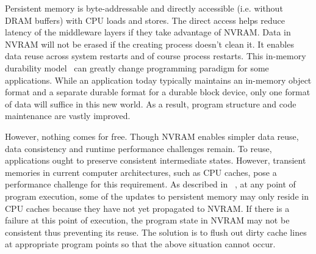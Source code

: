 \documentclass[preprint,nocopyrightspace,10pt]{sigplanconf}
\begin{document}
Persistent memory is byte-addressable and directly accessible (i.e. without DRAM buffers)
with CPU loads and stores. The direct access helps reduce latency of
the middleware layers if they take advantage of NVRAM. Data in NVRAM
will not be erased if the creating process doesn't  
clean it. It enables data reuse across system restarts and of course process restarts.
This in-memory durability model~\cite{Dhruva+:OOPSLA14} can greatly
change programming paradigm for some 
applications. While an application today typically maintains an
in-memory object format and a separate durable format for a durable
block device, only one format of data will suffice in this new world. 
As a result, program structure and code maintenance are vastly
improved. 

However, nothing comes for free. Though NVRAM enables simpler data reuse,
data consistency and runtime performance challenges remain. 
To reuse, applications ought to preserve consistent intermediate
states. However, transient memories in current computer architectures,
such as CPU caches, pose a performance challenge for this
requirement. As described in ~\cite{Dhruva+:OOPSLA14}, at any point of
program execution, some of the updates to persistent memory may only
reside in CPU caches because they have not yet propagated to NVRAM. If
there is a failure at this point of execution, the program state in
NVRAM may not be consistent thus preventing its reuse. The solution is
to flush out dirty cache lines at appropriate program points so that
the above situation cannot occur. 



%
\end{document}
